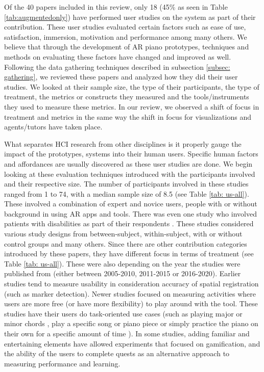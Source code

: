 \documentclass[sigchi, review]{acmart}
\begin{document}
Of the 40 papers included in this review, only 18 (45\% as seen in Table \ref{tab:augmentedonly}) have performed user studies on the system  as part of their contribution. These user studies evaluated certain factors such as ease of use, satisfaction, immersion, motivation and performance among many others. We believe that through the development of AR piano prototypes, techniques and methods on evaluating these factors have changed and improved as well. Following the data gathering techniques described in subsection \ref{subsec: gathering}, we reviewed these papers and analyzed how they did their user studies. We looked at their sample size, the type of their participants, the type of treatment, the metrics or constructs they measured and the tools/instruments they used to measure these metrics. In our review, we observed a shift of focus in treatment and metrics in the same way the shift in focus for visualizations and agents/tutors have taken place. 

What separates HCI research from other disciplines is it properly gauge the impact of the prototypes, systems into their human users. Specific human factors and affordances are usually discovered as these user studies are done. We begin looking at these evaluation techniques introduced with the participants involved and their respective size. The number of participants involved in these studies ranged from 1 to 74, with a median sample size of 8.5 (see Table \ref{tab: us-all}). These involved a combination of expert and novice users, people with or without background in using AR apps and tools. There was even one study who involved patients with disabilities as part of their respondents \cite{correa2009computer}. These studies considered various study designs from between-subject, within-subject, with or without control groups and many others. Since there are other contribution categories introduced by these papers, they have different focus in terms of treatment (see Table \ref{tab: us-all}). These were also depending on the year the studies were published from (either between 2005-2010, 2011-2015 or 2016-2020). Earlier studies tend to measure usability in consideration accuracy of spatial registration (such as marker detection). Newer studies focused on measuring activities where users are more free (or have more flexibility) to play around with the tool. These studies have their users do task-oriented use cases (such as playing major or minor chords \cite{nugraha2014pemanfaatan, xiao2010mirrorfugue}, play a specific song or piano piece \cite{chow2013music, sandnes2019enhanced,pan2018pilot} or simply practice the piano on their own for a specific amount of time \cite{weing2013piano, raymaekers2014game}). In some studies, adding familiar and entertaining elements have allowed experiments that focused on gamification, and the ability of the users to complete quests as an alternative approach to measuring performance and learning. 
\end{document}
